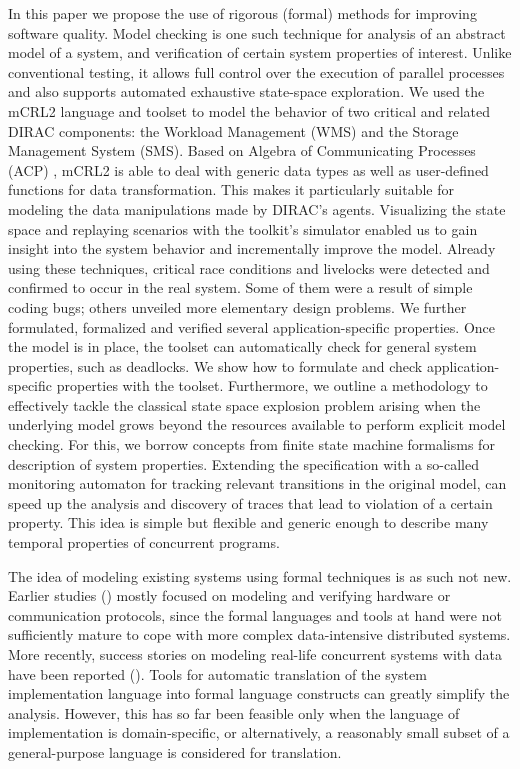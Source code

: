 \documentclass[sort&compress,preprint,3p]{elsarticle}
\begin{document}
In this paper we propose the use of rigorous (formal) methods for improving
software quality. Model checking \cite{ProcessesWithData} is one such technique for analysis of an
abstract model of a system, and verification of certain system properties of
interest. Unlike conventional testing, it allows full control over the execution
of parallel processes and also supports automated exhaustive state-space
exploration. We used the mCRL2 language \cite{FormalLanguagemCRL2} and toolset \cite{mCRL2Toolset} to model the behavior of two
critical and related DIRAC components: the Workload Management (WMS) and the
Storage Management System (SMS). Based on Algebra of Communicating Processes
(ACP) \cite{process_algebra}, mCRL2 is able to deal with generic data types as well as user-defined
functions for data transformation. This makes it particularly suitable for
modeling the data manipulations made by DIRAC's agents. Visualizing the state
space and replaying scenarios with the toolkit's simulator enabled us to gain
insight into the system behavior and incrementally improve the model. 
Already using these techniques, critical race conditions and livelocks were detected and confirmed to
occur in the real system. Some of them were a result of simple coding bugs;
others unveiled more elementary design problems. We further formulated,
formalized and verified several application-specific properties. Once
the model is in place, the toolset can automatically check for general system
properties, such as deadlocks. We show how to formulate and check
application-specific
properties with the toolset. Furthermore, we outline a methodology to
effectively tackle the classical state space explosion
problem arising when the underlying model grows beyond the resources available
to perform explicit model checking. For this, we borrow 
concepts from finite state machine formalisms for description of system properties.
Extending the specification with a so-called monitoring automaton for tracking 
relevant transitions in the original model, can speed up the
analysis and discovery of traces that lead to violation of a certain property.
This idea is simple but flexible and generic enough to describe many temporal properties of concurrent programs.

The idea of modeling existing systems using 
formal techniques is as such not new. Earlier studies
(\cite{SPIN_case_study,sessionMgmtMasterThesis,desing_validation_protocols,protocol_verification_muCRL,SLAMToolkit,SlidingWindowProtocol,DHCP_SPIN}) mostly focused
on modeling and verifying hardware or communication protocols, since
the formal languages and tools at hand were not sufficiently mature
to cope with more complex data-intensive distributed systems. More
recently, success stories on modeling real-life concurrent systems with
data have been reported (\cite{CMS_LHC, Linux_driver,verstoep_et_al, SystemC_processAlgebra,Java_PathFinder, ACS_mCRL2}).
Tools for automatic translation of the system implementation language into
 formal language constructs can greatly
simplify the analysis. However, this has so far been feasible only when the
language of implementation is domain-specific, or alternatively, a
reasonably small subset of a general-purpose language is considered for
translation. 
\end{document}
